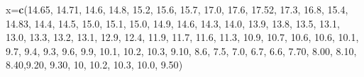 \documentclass[]{article}
\newenvironment{Shaded}{\begin{snugshade}}{\end{snugshade}}
\newcommand{\KeywordTok}[1]{\textcolor[rgb]{0.13,0.29,0.53}{\textbf{#1}}}
\newcommand{\DecValTok}[1]{\textcolor[rgb]{0.00,0.00,0.81}{#1}}
\newcommand{\FloatTok}[1]{\textcolor[rgb]{0.00,0.00,0.81}{#1}}
\newcommand{\NormalTok}[1]{#1}
\begin{document}
\begin{Shaded}
\begin{Highlighting}[]
\NormalTok{x=}\KeywordTok{c}\NormalTok{(}\FloatTok{14.65}\NormalTok{, }\FloatTok{14.71}\NormalTok{, }\FloatTok{14.6}\NormalTok{, }\FloatTok{14.8}\NormalTok{, }\FloatTok{15.2}\NormalTok{, }\FloatTok{15.6}\NormalTok{, }\FloatTok{15.7}\NormalTok{, }\FloatTok{17.0}\NormalTok{, }\FloatTok{17.6}\NormalTok{, }\FloatTok{17.52}\NormalTok{, }\FloatTok{17.3}\NormalTok{, }\FloatTok{16.8}\NormalTok{, }\FloatTok{15.4}\NormalTok{, }\FloatTok{14.83}\NormalTok{, }\FloatTok{14.4}\NormalTok{, }\FloatTok{14.5}\NormalTok{, }\FloatTok{15.0}\NormalTok{, }\FloatTok{15.1}\NormalTok{, }\FloatTok{15.0}\NormalTok{, }\FloatTok{14.9}\NormalTok{, }\FloatTok{14.6}\NormalTok{, }\FloatTok{14.3}\NormalTok{, }\FloatTok{14.0}\NormalTok{, }\FloatTok{13.9}\NormalTok{, }\FloatTok{13.8}\NormalTok{, }\FloatTok{13.5}\NormalTok{, }\FloatTok{13.1}\NormalTok{, }\FloatTok{13.0}\NormalTok{, }\FloatTok{13.3}\NormalTok{, }\FloatTok{13.2}\NormalTok{, }\FloatTok{13.1}\NormalTok{, }\FloatTok{12.9}\NormalTok{, }\FloatTok{12.4}\NormalTok{, }\FloatTok{11.9}\NormalTok{, }\FloatTok{11.7}\NormalTok{, }\FloatTok{11.6}\NormalTok{, }\FloatTok{11.3}\NormalTok{, }\FloatTok{10.9}\NormalTok{, }\FloatTok{10.7}\NormalTok{, }\FloatTok{10.6}\NormalTok{, }\FloatTok{10.6}\NormalTok{, }\FloatTok{10.1}\NormalTok{, }\FloatTok{9.7}\NormalTok{, }\FloatTok{9.4}\NormalTok{, }\FloatTok{9.3}\NormalTok{, }\FloatTok{9.6}\NormalTok{, }\FloatTok{9.9}\NormalTok{, }\FloatTok{10.1}\NormalTok{, }\FloatTok{10.2}\NormalTok{, }\FloatTok{10.3}\NormalTok{, }\FloatTok{9.10}\NormalTok{, }\FloatTok{8.6}\NormalTok{, }\FloatTok{7.5}\NormalTok{, }\FloatTok{7.0}\NormalTok{, }\FloatTok{6.7}\NormalTok{, }\FloatTok{6.6}\NormalTok{, }\FloatTok{7.70}\NormalTok{, }\FloatTok{8.00}\NormalTok{, }\FloatTok{8.10}\NormalTok{, }\FloatTok{8.40}\NormalTok{,}\FloatTok{9.20}\NormalTok{, }\FloatTok{9.30}\NormalTok{, }\DecValTok{10}\NormalTok{, }\FloatTok{10.2}\NormalTok{, }\FloatTok{10.3}\NormalTok{, }\FloatTok{10.0}\NormalTok{, }\FloatTok{9.50}\NormalTok{)                                                                                                       }

\end{Highlighting}
\end{Shaded}
\end{document}
